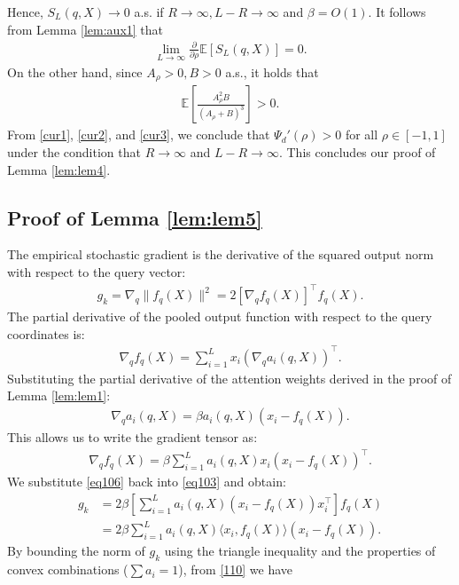 \documentclass[11pt,a4paper]{article}
\theoremstyle{definition}
\begin{document}
Hence, $S_L(q,X) \to 0$ a.s. if $R\to \infty, L-R \to \infty$ and $\beta=O(1)$.  It follows from Lemma \ref{lem:aux1} that
\begin{align}
\lim_{L \to \infty}  \frac{\partial}{\partial \rho} \mathbb{E}\left[ S_L(q,X) \right]=0 \label{cur2}.
\end{align}
On the other hand, since $A_{\rho}>0, B>0$ a.s., it holds that
\begin{align}
 \mathbb{E}\left[ \frac{A_\rho^2 B}{(A_\rho + B)^3} \right] >0 \label{cur3}.
\end{align}
From \eqref{cur1}, \eqref{cur2}, and \eqref{cur3}, we conclude that $\Psi_d'(\rho) > 0$ for all $\rho \in [-1, 1]$ under the condition that $R \to \infty$ and $L-R\to \infty$. This concludes our proof of Lemma \ref{lem:lem4}.  

\subsection{Proof of Lemma \ref{lem:lem5}}
The empirical stochastic gradient is the derivative of the squared output norm with respect to the query vector:
\begin{align}
g_k = \nabla_q \|f_q(X)\|^2 = 2 \left[ \nabla_q f_q(X) \right]^\top f_q(X)  \label{eq103}.
\end{align}
The partial derivative of the pooled output function with respect to the query coordinates is:
\begin{align}
\nabla_q f_q(X) = \sum_{i=1}^L x_i \left( \nabla_q a_i(q, X) \right)^\top.
\end{align}
Substituting the partial derivative of the attention weights derived in the proof of Lemma \ref{lem:lem1}:
\begin{align}
\nabla_q a_i(q, X) = \beta a_i(q, X) \left( x_i - f_q(X) \right).
\end{align}
This allows us to write the gradient tensor as:
\begin{align}
\nabla_q f_q(X) = \beta \sum_{i=1}^L a_i(q, X) x_i (x_i - f_q(X))^\top \label{eq106}.
\end{align}
We substitute \eqref{eq106} back into \eqref{eq103} and obtain:
\begin{align}
g_k &= 2 \beta \left[ \sum_{i=1}^L a_i(q, X) (x_i - f_q(X)) x_i^\top \right] f_q(X) \nonumber\\
&= 2 \beta \sum_{i=1}^L a_i(q, X) \langle x_i, f_q(X) \rangle (x_i - f_q(X)) \label{110}.
\end{align}
By bounding the norm of $g_k$ using the triangle inequality and the properties of convex combinations ($\sum a_i = 1$), from \eqref{110} we have
\end{document}
